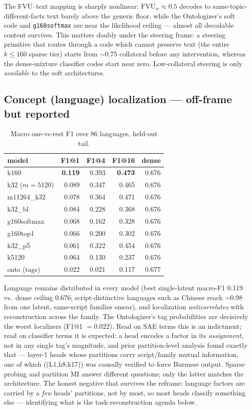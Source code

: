 \documentclass[11pt]{article}
\newcommand{\fvu}{\mathrm{FVU}_w}
\begin{document}
The FVU--text mapping is sharply nonlinear: $\fvu \approx 0.5$ decodes to
same-topic-different-facts text barely above the generic floor, while the
Ontologizer's soft code and \texttt{g160softmax} are near the likelihood
ceiling --- almost all decodable content survives. This matters doubly
under the steering frame: a steering primitive that routes through a code
which cannot preserve text (the entire $k{\leq}160$ sparse tier) starts
from $\sim$0.75 collateral before any intervention, whereas the
dense-mixture classifier codes start near zero. Low-collateral steering
is only \emph{available} to the soft architectures.

\subsection{Concept (language) localization --- off-frame but reported}

\begin{table}[h]\centering\small
\begin{tabular}{@{}lrrrr@{}}
\toprule
model & F1@1 & F1@4 & F1@16 & dense \\
\midrule
k160          & \textbf{0.119} & 0.393 & \textbf{0.473} & 0.676 \\
k32 ($m{=}5120$) & 0.089 & 0.347 & 0.465 & 0.676 \\
m11264\_k32   & 0.078 & 0.364 & 0.471 & 0.676 \\
k32\_bl       & 0.084 & 0.228 & 0.368 & 0.676 \\
g160softmax   & 0.068 & 0.162 & 0.328 & 0.676 \\
g160top1      & 0.066 & 0.200 & 0.302 & 0.676 \\
k32\_p5       & 0.061 & 0.322 & 0.454 & 0.676 \\
k5120         & 0.064 & 0.130 & 0.237 & 0.676 \\
onto (tags)   & 0.022 & 0.021 & 0.117 & 0.677 \\
\bottomrule
\end{tabular}
\caption{Macro one-vs-rest F1 over 86 languages, held-out tail.}
\end{table}

Language remains distributed in every model (best single-latent macro-F1
0.119 vs.\ dense ceiling 0.676; script-distinctive languages such as
Chinese reach $\sim$0.98 from one latent, same-script families smear),
and localization \emph{anticorrelates} with reconstruction across the
family. The Ontologizer's tag probabilities are decisively the worst
localizers (F1@1 $=0.022$). Read on SAE terms this is an indictment; read
on classifier terms it is expected: a head encodes a factor in its
\emph{assignment}, not in any single tag's magnitude, and prior
partition-level analysis found exactly that --- layer-1 heads whose
partitions carry script/family mutual information, one of which
((L1,h8,k17)) was causally verified to force Burmese output. Sparse
probing and partition MI answer different questions; only the latter
matches the architecture. The honest negative that survives the reframe:
language factors are carried by a \emph{few} heads' partitions, not by
most, so most heads classify something else --- identifying what is the
task-reconstruction agenda below.
\end{document}
